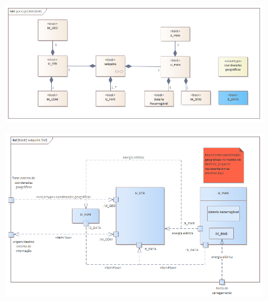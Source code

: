 \documentclass{article}
\begin{document}
    \begin{figure}[H]
        \centering
        \vspace*{1.4cm}
        \includegraphics[origin=c, angle=-90]{BDD.png}
    \end{figure}

    \begin{figure}[H]
        \centering
        \vspace*{1.4cm}
        \includegraphics[origin=c, angle=-90]{IBD.png}
    \end{figure}
\end{document}
